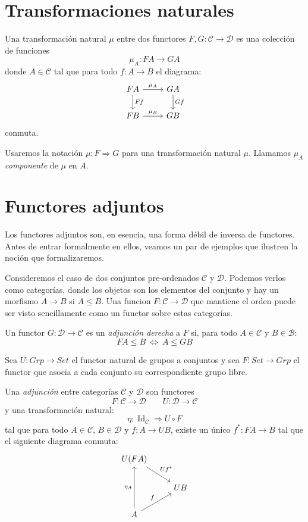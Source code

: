 \documentclass[12pt, twoside]{book}
\newcommand{\cat}{{\mathcal{C}}}
\newcommand{\Set}{{Set}}
\newcommand{\Grp}{{Grp}}
\newcommand{\sii}{{\ \Leftrightarrow\ }}
\DeclareMathOperator{\Id}{Id}
\begin{document}
\section{Transformaciones naturales}
\begin{definition}
Una transformación natural $\mu$ entre dos functores $F, G \colon \cat \to \mathcal{D}$ es una colección de funciones
\[ \mu_A \colon F A \to G A \]
donde $A \in \cat$ tal que para todo $f \colon A \to B$ el diagrama:
\[
\begin{tikzcd}
F A \arrow[r,"\mu_A"] \arrow[d,"F f"] & G A \arrow[d,"G f"]\\
F B \arrow[r,"\mu_B"] & G B
\end{tikzcd}
\]
conmuta.
\end{definition}

Usaremos la notación $\mu \colon F \Rightarrow G$ para una transformación natural $\mu$.
Llamamos $\mu_A$ \emph{componente} de $\mu$ en $A$.

\section{Functores adjuntos}
Los functores adjuntos son, en esencia, una forma débil de inversa de functores.
Antes de entrar formalmente en ellos, veamos un par de ejemplos que ilustren la noción que formalizaremos.

\begin{example}
Consideremos el caso de dos conjuntos pre-ordenados $\cat$ y $\mathcal{D}$.
Podemos verlos como categorías, donde los objetos son los elementos del conjunto y hay un morfismo $A \to B$ si $A \leq B$.
Una funcion $F \colon \cat \to \mathcal{D}$ que mantiene el orden puede ser visto sencillamente como un functor sobre estas categorías.

Un functor $G \colon \mathcal{D} \to \cat$ es un \emph{adjunción derecha} a $F$ si, para todo $A \in \cat$ y $B \in \mathcal{B}$:
\[ F A \leq B \sii A \leq G B \]
\end{example}

\begin{example}
Sea $U \colon \Grp \to \Set$ el functor natural de grupos a conjuntos y sea $F \colon \Set \to \Grp$ el functor que asocia a cada conjunto su correspondiente grupo libre.
\end{example}

\begin{definition}
Una \emph{adjunción} entre categorías $\cat$ y $\mathcal{D}$ son functores
\[ F \colon \cat \to \mathcal{D} \qquad U \colon \mathcal{D} \to \cat \]
y una transformación natural:
\[ \eta \colon \Id_\cat \Rightarrow U \circ F \]
tal que para todo $A \in \cat$, $B \in \mathcal{D}$ y $f \colon A \to U B$, existe un único $f^* \colon F A \to B$ tal que el siguiente diagrama conmuta:
\[
\begin{tikzcd}
U (F A) \arrow[dr,"U f^*"]\\
& U B\\
A \arrow[ur,"f"] \arrow[uu,"\eta_A"]
\end{tikzcd}
\]
\end{definition}
\end{document}
